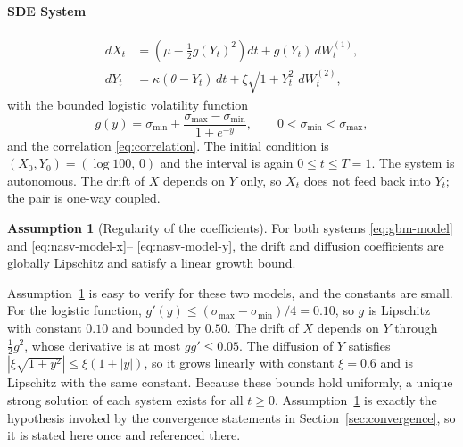 \documentclass[11pt,a4paper]{article}
\theoremstyle{definition}
\newtheorem{assumption}[theorem]{Assumption}
\theoremstyle{remark}
\begin{document}
\paragraph{SDE System}
\begin{align}
    dX_t &= \left( \mu - \tfrac12 g(Y_t)^2 \right) dt
            + g(Y_t)\, dW_t^{(1)},
    \label{eq:nasv-model-x} \\[2pt]
    dY_t &= \kappa (\theta - Y_t)\, dt
            + \xi \sqrt{1 + Y_t^{2}}\; dW_t^{(2)},
    \label{eq:nasv-model-y}
\end{align}
with the bounded logistic volatility function
\begin{equation}
    g(y) = \sigma_{\min} + \frac{\sigma_{\max} - \sigma_{\min}}{1 + e^{-y}},
    \qquad 0 < \sigma_{\min} < \sigma_{\max},
    \label{eq:nasv-g}
\end{equation}
and the correlation \eqref{eq:correlation}. The initial condition is
$(X_0, Y_0) = (\log 100,\, 0)$ and the interval is again $0 \le t \le T = 1$.
The system is autonomous. The drift of $X$ depends on $Y$ only, so $X_t$ does
not feed back into $Y_t$; the pair is one-way coupled.

\begin{assumption}[Regularity of the coefficients]
\label{ass:regularity}
For both systems \eqref{eq:gbm-model} and \eqref{eq:nasv-model-x}--%
\eqref{eq:nasv-model-y}, the drift and diffusion coefficients are globally
Lipschitz and satisfy a linear growth bound.
\end{assumption}

Assumption~\ref{ass:regularity} is easy to verify for these two models, and the
constants are small. For the logistic function,
$g'(y) \le (\sigma_{\max} - \sigma_{\min})/4 = 0.10$, so $g$ is Lipschitz with
constant $0.10$ and bounded by $0.50$. The drift of $X$ depends on $Y$ through
$\tfrac12 g^2$, whose derivative is at most $g g' \le 0.05$. The diffusion of
$Y$ satisfies $\left| \xi \sqrt{1 + y^2} \right| \le \xi (1 + |y|)$, so it grows
linearly with constant $\xi = 0.6$ and is Lipschitz with the same constant.
Because these bounds hold uniformly, a unique strong solution of each system
exists for all $t \ge 0$. Assumption~\ref{ass:regularity} is exactly the
hypothesis invoked by the convergence statements in
Section~\ref{sec:convergence}, so it is stated here once and referenced there.
\end{document}
